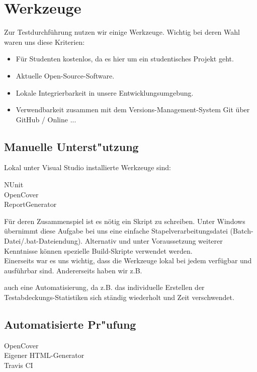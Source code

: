 %



\section{Werkzeuge}
\label{Abschnitt:Tests:Werkzeuge}

Zur Testdurchführung nutzen wir einige Werkzeuge. Wichtig bei deren Wahl waren uns diese Kriterien:

\begin{itemize}

	\item Für Studenten kostenlos, da es hier um ein studentisches Projekt geht.
	\item Aktuelle Open-Source-Software.
	\item Lokale Integrierbarkeit in unsere Entwicklungsumgebung.
	\item Verwendbarkeit zusammen mit dem Versions-Management-System Git über GitHub / Online ... %

\end{itemize}

\subsection{Manuelle Unterst{"u}tzung}
\label{Abschnitt:Programmfehler:Werkzeuge:Manuell}

Lokal unter Visual Studio installierte Werkzeuge sind:

\begin{description}

	\item[NUnit]
	
	\item[OpenCover]
	
	\item[ReportGenerator]

\end{description}

Für deren Zusammenspiel ist es nötig ein Skript zu schreiben. Unter Windows übernimmt diese Aufgabe bei uns eine einfache Stapelverarbeitungsdatei (Batch-Datei/.bat-Dateiendung).
Alternativ und unter Voraussetzung weiterer Kenntnisse können spezielle Build-Skripte verwendet werden.\\
Einerseits war es uns wichtig, dass die Werkzeuge lokal bei jedem verfügbar und ausführbar sind. Andererseits haben wir z.B.


auch eine Automatisierung, da z.B. das individuelle Erstellen der Testabdeckungs-Statistiken sich ständig wiederholt und Zeit verschwendet. %



\subsection{Automatisierte Pr{"u}fung}
\label{Abschnitt:Programmfehler:Werkzeuge:Automatisiert}


\begin{description}

	\item[OpenCover]
	
	\item[Eigener HTML-Generator]
	
	\item[Travis CI]

\end{description}

